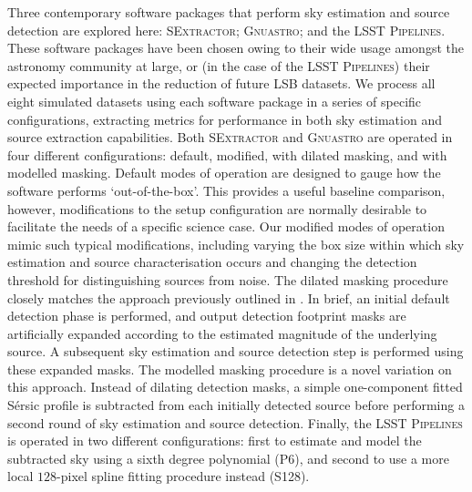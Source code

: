 \documentclass[fleqn,usenatbib,useAMS]{mnras}
\newcommand*{\Sersic}{S\'{e}rsic\xspace}
\newcommand*{\SExtractor}{\textsc{SExtractor}\xspace}
\newcommand*{\Gnuastro}{\textsc{Gnuastro}\xspace}
\newcommand*{\LSSTPs}{\textsc{LSST Pipelines}\xspace}
\newcommand*{\DMA}{\textsc{P6}\xspace}
\newcommand*{\DMB}{\textsc{S128}\xspace}
\begin{document}
Three contemporary software packages that perform sky estimation and source detection are explored here: \SExtractor \citep{Bertin1996}; \Gnuastro \citep{Akhlaghi2015}; and the \LSSTPs \citep{Bosch2018,Bosch2019}. These software packages have been chosen owing to their wide usage amongst the astronomy community at large, or (in the case of the \LSSTPs) their expected importance in the reduction of future LSB datasets. We process all eight simulated datasets using each software package in a series of specific configurations, extracting metrics for performance in both sky estimation and source extraction capabilities. Both \SExtractor and \Gnuastro are operated in four different configurations: default, modified, with dilated masking, and with modelled masking. Default modes of operation are designed to gauge how the software performs `out-of-the-box'. This provides a useful baseline comparison, however, modifications to the setup configuration are normally desirable to facilitate the needs of a specific science case. Our modified modes of operation mimic such typical modifications, including varying the box size within which sky estimation and source characterisation occurs and changing the detection threshold for distinguishing sources from noise. The dilated masking procedure closely matches the approach previously outlined in \citet{Ji2018}. In brief, an initial default detection phase is performed, and output detection footprint masks are artificially expanded according to the estimated magnitude of the underlying source. A subsequent sky estimation and source detection step is performed using these expanded masks. The modelled masking procedure is a novel variation on this approach. Instead of dilating detection masks, a simple one-component fitted \Sersic profile is subtracted from each initially detected source before performing a second round of sky estimation and source detection. Finally, the \LSSTPs is operated in two different configurations: first to estimate and model the subtracted sky using a sixth degree polynomial (\DMA), and second to use a more local $128$-pixel spline fitting procedure instead (\DMB). 
\end{document}
